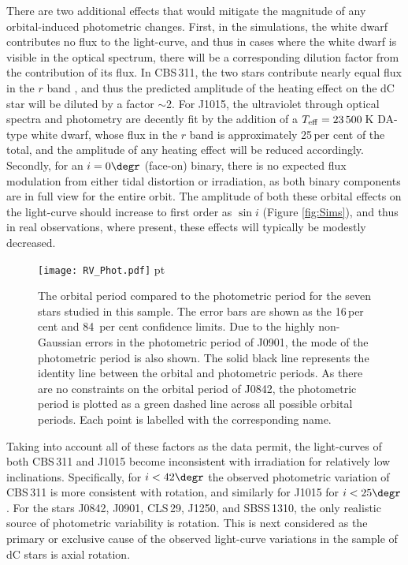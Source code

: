 \documentclass[fleqn,usenatbib,useAMS]{mnras}
\begin{document}
There are two additional effects that would mitigate the magnitude of any orbital-induced photometric changes.  First, in the simulations, the white dwarf contributes no flux to the light-curve, and thus in cases where the white dwarf is visible in the optical spectrum, there will be a corresponding dilution factor from the contribution of its flux.  In CBS\,311, the two stars contribute nearly equal flux in the $r$ band \citep{Liebert1994}, and thus the predicted amplitude of the heating effect on the dC star will be diluted by a factor $\sim$2.  For J1015, the ultraviolet through optical spectra and photometry are decently fit by the addition of a $T_{\rm eff}=23\,500$\,K DA-type white dwarf, whose flux in the $r$ band is approximately 25\,per cent of the total, and the amplitude of any heating effect will be reduced accordingly.  Secondly, for an $i=0\degr$ (face-on) binary, there is no expected flux modulation from either tidal distortion or irradiation, as both binary components are in full view for the entire orbit.  The amplitude of both these orbital effects on the light-curve should increase to first order as $\sin{i}$ (Figure \ref{fig:Sims}), and thus in real observations, where present, these effects will typically be modestly decreased.  


\begin{figure}
\texttt{[image: RV\_Phot.pdf]}
 pt
\caption{The orbital period compared to the photometric period for the seven stars studied in this sample.  The error bars are shown as the 16\,per cent and 84\, per cent confidence limits.  Due to the highly non-Gaussian errors in the photometric period of J0901, the mode of the photometric period is also shown.  The solid black line represents the identity line between the orbital and photometric periods.  As there are no constraints on the orbital period of J0842, the photometric period is plotted as a green dashed line across all possible orbital periods. Each point is labelled with the corresponding name.}
\label{fig:Photvsrvp}
\end{figure}


Taking into account all of these factors as the data permit, the light-curves of both CBS\,311 and J1015 become inconsistent with irradiation for relatively low inclinations.  Specifically, for $i<42\degr$ the observed photometric variation of CBS\,311 is more consistent with rotation, and similarly for J1015 for $i<25\degr$.  For the stars J0842, J0901, CLS\,29, J1250, and SBSS\,1310, the only realistic source of photometric variability is rotation.  This is next considered as the primary or exclusive cause of the observed light-curve variations in the sample of dC stars is axial rotation.
\end{document}
